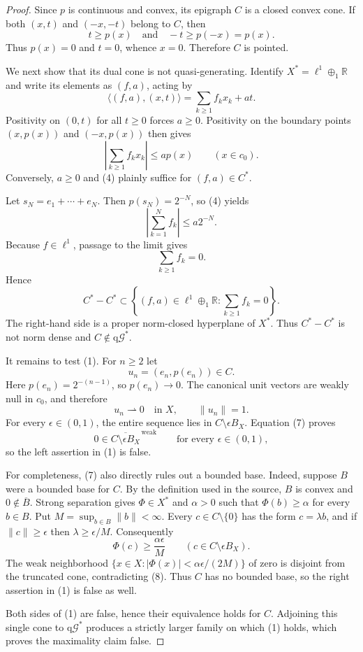 \documentclass[11pt]{article}
\newcommand{\R}{\mathbb R}
\newcommand{\qG}{\mathrm{q}\mathcal G^*}
\begin{document}
\begin{proof}
Since $p$ is continuous and convex, its epigraph $C$ is a closed convex cone.
If both $(x,t)$ and $(-x,-t)$ belong to $C$, then
\[
 t\geq p(x)
 \quad\text{and}\quad
 -t\geq p(-x)=p(x).
\]
Thus $p(x)=0$ and $t=0$, whence $x=0$.  Therefore $C$ is pointed.

We next show that its dual cone is not quasi-generating.  Identify
$X^*=\ell^1\oplus_1\R$ and write its elements as $(f,a)$, acting by
\[
 \langle(f,a),(x,t)\rangle=\sum_{k\geq1}f_kx_k+at.
\]
Positivity on $(0,t)$ for all $t\geq0$ forces $a\geq0$.  Positivity on the
boundary points $(x,p(x))$ and $(-x,p(x))$ then gives
\[
 \left|\sum_{k\geq1}f_kx_k\right|\leq a p(x)
 \qquad(x\in c_0).                                      \tag{4}
\]
Conversely, $a\geq0$ and (4) plainly suffice for $(f,a)\in C^*$.

Let $s_N=e_1+\cdots+e_N$.  Then $p(s_N)=2^{-N}$, so (4) yields
\[
 \left|\sum_{k=1}^Nf_k\right|\leq a2^{-N}.
\]
Because $f\in\ell^1$, passage to the limit gives
\[
 \sum_{k\geq1}f_k=0.                                    \tag{5}
\]
Hence
\[
 C^*-C^*\subset
 \left\{(f,a)\in\ell^1\oplus_1\R:
              \sum_{k\geq1}f_k=0\right\}.              \tag{6}
\]
The right-hand side is a proper norm-closed hyperplane of $X^*$.
Thus $C^*-C^*$ is not norm dense and $C\notin\qG$.

It remains to test (1).  For $n\geq2$ let
\[
 u_n=(e_n,p(e_n))\in C.
\]
Here $p(e_n)=2^{-(n-1)}$, so $p(e_n)\to0$.  The canonical unit vectors are
weakly null in $c_0$, and therefore
\[
 u_n\rightharpoonup0\quad\text{in }X,
 \qquad \|u_n\|=1.                                     \tag{7}
\]
For every $\epsilon\in(0,1)$, the entire sequence lies in
$C\setminus\epsilon B_X$.  Equation (7) proves
\[
 0\in\overline{C\setminus\epsilon B_X}^{\,\mathrm{weak}}
 \qquad\text{for every }\epsilon\in(0,1),               \tag{8}
\]
so the left assertion in (1) is false.

For completeness, (7) also directly rules out a bounded base.  Indeed,
suppose $B$ were a bounded base for $C$.  By the definition used in the
source, $B$ is convex and $0\notin\overline B$.  Strong separation gives
$\Phi\in X^*$ and $\alpha>0$ such that
$\Phi(b)\geq\alpha$ for every $b\in B$.  Put
$M=\sup_{b\in B}\|b\|<\infty$.  Every $c\in C\setminus\{0\}$ has the
form $c=\lambda b$, and if $\|c\|\geq\epsilon$ then
$\lambda\geq\epsilon/M$.  Consequently
\[
 \Phi(c)\geq\frac{\alpha\epsilon}{M}
 \qquad(c\in C\setminus\epsilon B_X).                  \tag{9}
\]
The weak neighborhood
$\{x\in X:|\Phi(x)|<\alpha\epsilon/(2M)\}$ of zero is disjoint from the
truncated cone, contradicting (8).  Thus $C$ has no bounded base, so the
right assertion in (1) is false as well.

Both sides of (1) are false, hence their equivalence holds for $C$.
Adjoining this single cone to $\qG$ produces a strictly larger family on
which (1) holds, which proves the maximality claim false.
\end{proof}
\end{document}
